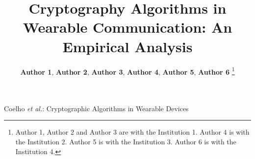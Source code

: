 \documentclass[journal]{IEEEtran}
\begin{document}
\title{Cryptography Algorithms in Wearable
Communication: An Empirical Analysis}



\author{%
{\bf Author 1}, {\bf Author 2}, %
{\bf Author 3}, %
{\bf Author 4}, %
{\bf Author 5}, {\bf Author 6} \vspace{-0.5cm}%
\thanks{Author 1, Author 2 and Author 3 are with the Institution 1. Author 4 is with the Institution 2. Author 5 is with the Institution 3. Author 6 is with the Institution 4.}
\vspace{-0.5cm}}


%
{Coelho \MakeLowercase{\textit{et al.}}: Cryptographic Algorithms in Wearable Devices}


\maketitle
{}
\end{document}
